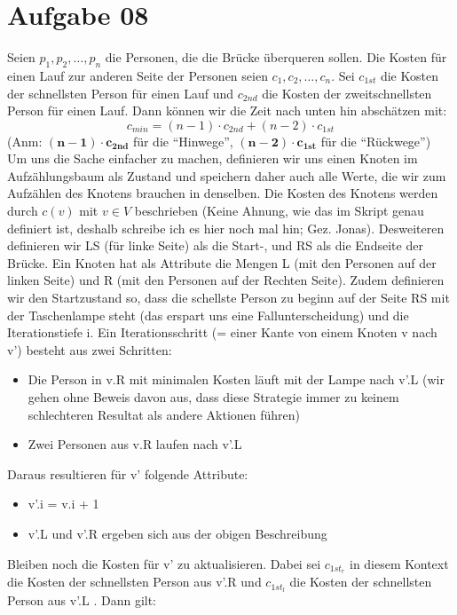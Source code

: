 \documentclass[10pt,a4paper]{article}
\begin{document}
    
\section*{Aufgabe 08}
    Seien ${p_1, p_2, \ldots, p_n}$ die Personen, die die Br\"ucke \"uberqueren
    sollen. Die Kosten f\"ur einen Lauf zur anderen Seite der Personen seien
    $c_1, c_2, \ldots, c_n$. Sei $c_{1st}$ die Kosten der schnellsten Person
    f\"ur einen Lauf und $c_{2nd}$ die Kosten der zweitschnellsten Person 
    f\"ur einen Lauf. Dann k\"onnen wir die Zeit nach unten hin absch\"atzen mit:
    $$
        c_{min} = (n-1) \cdot c_{2nd} + (n-2) \cdot c_{1st}
    $$
    (Anm: $\mathbf{(n-1) \cdot c_{2nd}}$ f\"ur die ``Hinwege'', 
    $\mathbf{(n-2) \cdot c_{1st}}$ f\"ur die ``R\"uckwege'') \\
    Um uns die Sache einfacher zu machen, definieren wir uns einen Knoten
    im Aufz\"ahlungsbaum als Zustand und speichern daher auch alle
    Werte, die wir zum Aufz\"ahlen des Knotens brauchen in denselben.
    Die Kosten des Knotens werden durch $c(v)$ mit $v \in V$ beschrieben
    (Keine Ahnung, wie das im Skript genau definiert ist, deshalb schreibe ich
    es hier noch mal hin; Gez. Jonas).
    Desweiteren definieren wir LS (f\"ur linke Seite) als die Start-, 
    und RS als die Endseite der Br\"ucke.
    Ein Knoten hat als Attribute die Mengen L (mit den Personen auf der
    linken Seite) und R (mit den Personen auf der Rechten Seite).
    Zudem definieren wir den Startzustand so, dass die schellste Person
    zu beginn auf der Seite RS mit der Taschenlampe steht (das erspart
    uns eine Fallunterscheidung)
    und die Iterationstiefe i. Ein Iterationsschritt (= einer Kante von einem
    Knoten v nach v') besteht aus zwei Schritten:
    \begin{itemize}
        \item Die Person in v.R mit minimalen Kosten l\"auft mit der Lampe nach
              v'.L (wir gehen ohne Beweis davon aus, dass diese Strategie immer
              zu keinem schlechteren Resultat als andere Aktionen f\"uhren)
        \item Zwei Personen aus v.R laufen nach v'.L 
    \end{itemize}
    Daraus resultieren f\"ur v' folgende Attribute:
    \begin{itemize}
        \item v'.i = v.i + 1
        \item v'.L und v'.R ergeben sich aus der obigen Beschreibung
    \end{itemize}
    Bleiben noch die Kosten f\"ur v' zu aktualisieren. Dabei sei $c_{1st_r}$ in diesem
    Kontext die Kosten der schnellsten Person aus v'.R und $c_{1st_l}$ die Kosten
    der schnellsten Person aus v'.L . Dann gilt:
    
\end{document}
